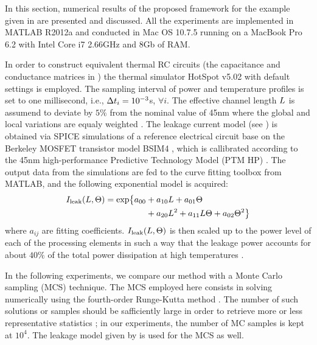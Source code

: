 In this section, numerical results of the proposed framework for the example given in  are presented and discussed. All the experiments are implemented in MATLAB R2012a \cite{matlab} and conducted in Mac OS 10.7.5 running on a MacBook Pro 6.2 with Intel Core i7 2.66GHz and 8Gb of RAM.

In order to construct equivalent thermal RC circuits (the capacitance and conductance matrices in ) the thermal simulator HotSpot v5.02 \cite{hotspot} with default settings is employed. The sampling interval of power and temperature profiles is set to one millisecond, i.e., $\Delta t_i = 10^{-3}$s, $\forall i$. The effective channel length $L$ is assumend to deviate by $5\%$ from the nominal value of 45nm where the global and local variations are equaly weighted \cite{juan2012}. The leakage current model (see ) is obtained via SPICE simulations of a reference electrical circuit base on the Berkeley MOSFET transistor model BSIM4 \cite{bsim4}, which is callibrated according to the 45nm high-performance Predictive Technology Model (PTM HP) \cite{ptm}. The output data from the simulations are fed to the curve fitting toolbox from MATLAB, and the following exponential model is acquired:
\begin{align} \elabel{leakage-current}
  I_\leak(\Leff, \T) = \text{exp} \big\{ a_{00} & + a_{10} \Leff + a_{01} \T \\
  & {} + a_{20} \Leff^2 + a_{11} \Leff \T + a_{02} \T^2 \big\} \nonumber
\end{align}
where $a_{ij}$ are fitting coefficients. $I_{\text{leak}}(L, \Theta)$ is then scaled up to the power level of each of the processing elements in such a way that the leakage power accounts for about $40\%$ of the total power dissipation at high temperatures \cite{liu2007}.

In the following experiments, we compare our method with a Monte Carlo sampling (MCS) technique. The MCS employed here consists in solving  numerically using the fourth-order Runge-Kutta method \cite{press2007}. The number of such solutions or samples should be safficiently large in order to retrieve more or less representative statistics \cite{xiu2009}; in our experiments, the number of MC samples is kept at $10^4$. The leakage model given by  is used for the MCS as well.

